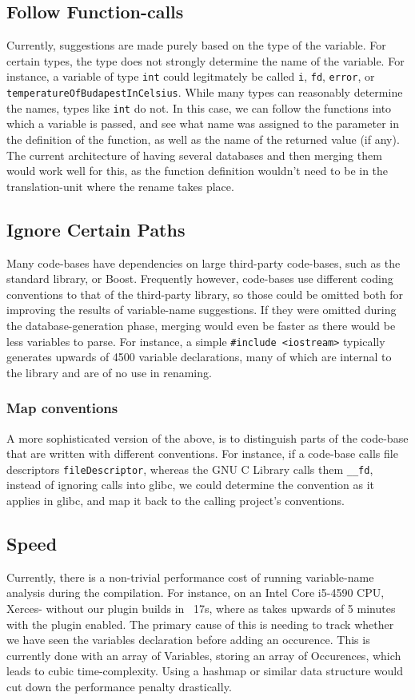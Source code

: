 \subsection{Follow Function-calls}
Currently, suggestions are made purely based on the type of the variable. For
certain types, the type does not strongly determine the name of the variable.
For instance, a variable of type \lstinline|int| could legitmately be called
\lstinline|i|, \lstinline|fd|, \lstinline|error|, or
\lstinline|temperatureOfBudapestInCelsius|. While many types can reasonably
determine the names, types like \lstinline|int| do not. In this case, we can
follow the functions into which a variable is passed, and see what name was
assigned to the parameter in the definition of the function, as well as the name
of the returned value (if any). The current architecture of having several
databases and then merging them would work well for this, as the function
definition wouldn't need to be in the translation-unit where the rename takes
place.

\subsection{Ignore Certain Paths}
Many code-bases have dependencies on large third-party code-bases, such as the
\CC{} standard library, or Boost. Frequently however, code-bases use different
coding conventions to that of the third-party library, so those could be omitted
both for improving the results of variable-name suggestions. If they were
omitted during the database-generation phase, merging would even be faster as
there would be less variables to parse. For instance, a simple
\lstinline|#include <iostream>| typically generates upwards of 4500 variable
declarations, many of which are internal to the library and are of no use in
renaming.

\subsubsection{Map conventions}
A more sophisticated version of the above, is to distinguish parts of the
code-base that are written with different conventions. For instance, if a
code-base calls file descriptors \lstinline|fileDescriptor|, whereas the GNU C
Library \cite{glibc} calls them \lstinline|__fd|, instead of ignoring calls into
glibc, we could determine the convention as it applies in glibc, and map it back
to the calling project's conventions.

\subsection{Speed}
Currently, there is a non-trivial performance cost of running variable-name
analysis during the compilation. For instance, on an Intel Core i5-4590 CPU,
Xerces-\CC{} without our plugin builds in ~17s, where as takes upwards of 5
minutes with the plugin enabled. The primary cause of this is needing to track
whether we have seen the variables declaration before adding an occurence. This
is currently done with an array of Variables, storing an array of Occurences,
which leads to cubic time-complexity. Using a hashmap or similar data structure
would cut down the performance penalty drastically.
